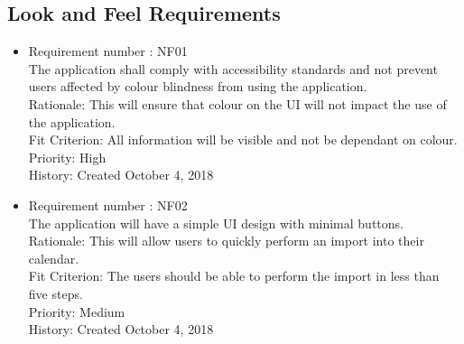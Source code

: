 \documentclass[12pt, titlepage]{article}
\begin{document}
\subsection{Look and Feel Requirements}
\begin{itemize}
\item Requirement number : NF01\\
The application shall comply with accessibility standards and not prevent users affected by colour blindness from using the application.\\
Rationale: This will ensure that colour on the UI will not impact the use of the application.\\
Fit Criterion: All information will be visible and not be dependant on colour.\\
Priority: High\\
History: Created October 4, 2018

\item Requirement number : NF02 \\
The application will have a simple UI design with minimal buttons.\\
Rationale: This will allow users to quickly perform an import into their calendar.\\
Fit Criterion: The users should be able to perform the import in less than five steps.\\
Priority: Medium\\
History: Created October 4, 2018

\end{itemize}
\end{document}
